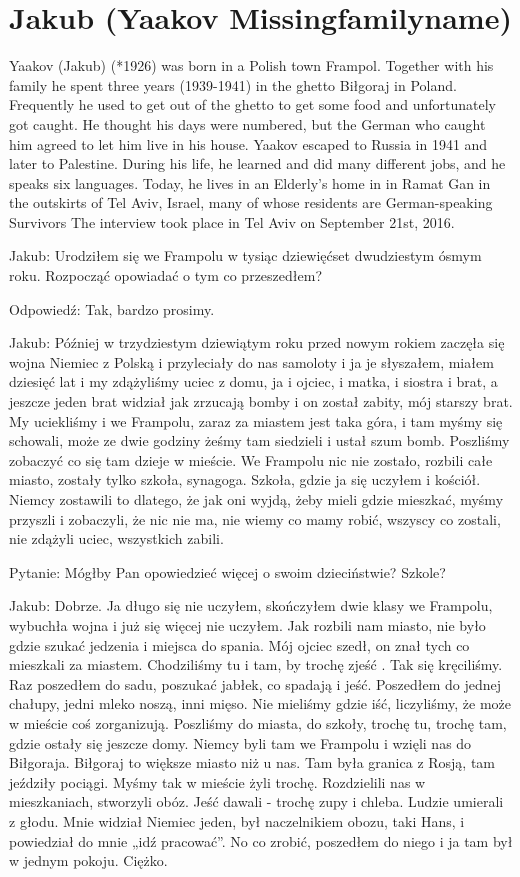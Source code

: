\section{Jakub (Yaakov Missingfamilyname)}

Yaakov (Jakub) (*1926) was born in a Polish town Frampol. Together with his family he spent three years (1939-1941) in the ghetto Biłgoraj in Poland. Frequently he used to get out of the ghetto to get some food and unfortunately got caught. He thought his days were numbered, but the German who caught him agreed to let him live in his house. Yaakov escaped to Russia in 1941 and later to Palestine. During his life, he learned and did many different jobs, and he speaks six languages. Today, he lives in an Elderly’s home in in Ramat Gan in the outskirts of Tel Aviv, Israel, many of whose residents are German-speaking Survivors The interview took place in Tel Aviv on September 21st, 2016. 

Jakub:  Urodziłem się we Frampolu w tysiąc dziewięćset dwudziestym ósmym roku. Rozpocząć opowiadać o tym co przeszedłem? 

Odpowiedź: Tak, bardzo prosimy. 

Jakub: Później w trzydziestym dziewiątym roku przed nowym rokiem zaczęła się wojna Niemiec          z Polską i przyleciały do nas samoloty i ja je słyszałem, miałem dziesięć lat i my zdążyliśmy uciec             z domu, ja i ojciec, i matka, i siostra i brat,  a jeszcze jeden brat widział jak zrzucają  bomby i on został zabity, mój starszy brat. My uciekliśmy i we Frampolu, zaraz za miastem jest taka góra, i tam myśmy się schowali, może ze dwie godziny żeśmy tam siedzieli i ustał szum bomb. Poszliśmy zobaczyć co się tam dzieje w mieście. We Frampolu nic nie zostało, rozbili całe miasto, zostały tylko szkoła, synagoga. Szkoła, gdzie ja się uczyłem i kościół. Niemcy zostawili to dlatego, że jak oni wyjdą, żeby mieli gdzie mieszkać,  myśmy przyszli i zobaczyli, że nic nie ma, nie wiemy co mamy robić, wszyscy co zostali,    nie zdążyli uciec, wszystkich zabili.  

Pytanie: Mógłby Pan opowiedzieć więcej o swoim dzieciństwie? Szkole? 

Jakub: Dobrze. Ja długo się nie uczyłem, skończyłem dwie klasy we Frampolu, wybuchła wojna i już się więcej nie uczyłem. Jak rozbili nam miasto, nie było gdzie szukać jedzenia i miejsca do spania. Mój ojciec szedł, on znał tych co mieszkali za miastem. Chodziliśmy tu i tam, by trochę zjeść . Tak się kręciliśmy. Raz poszedłem do sadu, poszukać jabłek, co spadają i jeść. Poszedłem do jednej chałupy,  jedni mleko noszą, inni mięso. Nie mieliśmy gdzie iść, liczyliśmy, że może w mieście coś zorganizują. Poszliśmy do miasta, do szkoły, trochę tu, trochę tam, gdzie ostały się jeszcze domy. Niemcy byli tam we Frampolu i wzięli nas do Biłgoraja. Biłgoraj to większe miasto niż u nas.  Tam była granica z Rosją, tam jeździły pociągi. Myśmy tak w mieście żyli trochę. Rozdzielili nas w mieszkaniach, stworzyli obóz. Jeść dawali - trochę zupy i chleba. Ludzie umierali z głodu. Mnie widział Niemiec jeden,                       był naczelnikiem obozu, taki Hans, i powiedział do mnie „idź pracować”. No co zrobić, poszedłem do niego i ja tam był w jednym pokoju. Ciężko. 

